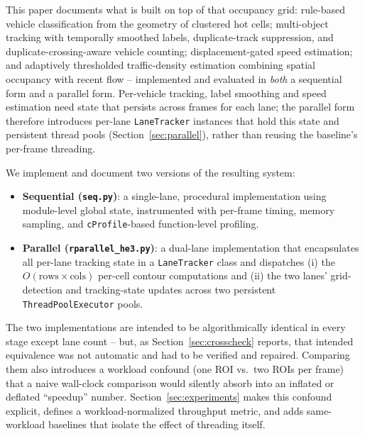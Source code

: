\documentclass[conference]{IEEEtran}
\newcommand{\code}[1]{\texttt{#1}}
\begin{document}
This paper documents what is built on top of that occupancy grid:
rule-based vehicle classification from the geometry of clustered hot
cells; multi-object tracking with temporally smoothed labels,
duplicate-track suppression, and duplicate-crossing-aware vehicle
counting; displacement-gated speed estimation; and adaptively
thresholded traffic-density estimation combining spatial occupancy with
recent flow -- implemented and evaluated in \emph{both} a sequential
form and a parallel form. Per-vehicle tracking, label smoothing and
speed estimation need state that persists across frames for each lane;
the parallel form therefore introduces per-lane \code{LaneTracker}
instances that hold this state and persistent thread pools
(Section~\ref{sec:parallel}), rather than reusing the baseline's
per-frame threading.

We implement and document two versions of the resulting system:

\begin{itemize}
\item \textbf{Sequential (\code{seq.py})}: a single-lane, procedural
implementation using module-level global state, instrumented with
per-frame timing, memory sampling, and \code{cProfile}-based
function-level profiling.
\item \textbf{Parallel (\code{rparallel\_he3.py})}: a dual-lane
implementation that encapsulates all per-lane tracking state in a
\code{LaneTracker} class and dispatches (i) the $O(\text{rows}\times
\text{cols})$ per-cell contour computations and (ii) the two lanes'
grid-detection and tracking-state updates across two persistent
\code{ThreadPoolExecutor} pools.
\end{itemize}

The two implementations are intended to be algorithmically identical in
every stage except lane count -- but, as Section~\ref{sec:crosscheck}
reports, that intended equivalence was not automatic and had to be
verified and repaired. Comparing them also introduces a workload
confound (one ROI vs.\ two ROIs per frame) that a naive wall-clock
comparison would silently absorb into an inflated or deflated
``speedup'' number. Section~\ref{sec:experiments} makes this confound
explicit, defines a workload-normalized throughput metric, and adds
same-workload baselines that isolate the effect of threading itself.
\end{document}
